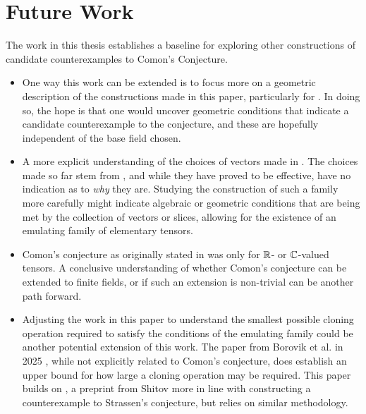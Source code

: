 \documentclass[../Lael_John_MasterThesis_Draft.tex]{subfiles}
\begin{document}
\section{Future Work}\label{section:furtherwork}
The work in this thesis establishes a baseline for exploring other constructions of candidate counterexamples to Comon's Conjecture. 
\begin{itemize}
    \item One way this work can be extended is to focus more on a geometric description of the constructions made in this paper, particularly for . In doing so, the hope is that one would uncover geometric conditions that indicate a candidate counterexample to the conjecture, and these are hopefully independent of the base field chosen. 
    \item A more explicit understanding of the choices of vectors made in . The choices made so far stem from \cite{shitov_comons_2020}, and while they have proved to be effective, have no indication as to \textit{why} they are. Studying the construction of such a family more carefully might indicate algebraic or geometric conditions that are being met by the collection of vectors or slices, allowing for the existence of an emulating family of elementary tensors.
    \item Comon's conjecture as originally stated in \cite{oeding_report_2008} was only for $\mathbb{R}$- or $\mathbb{C}$-valued tensors. A conclusive understanding of whether Comon's conjecture can be extended to finite fields, or if such an extension is non-trivial can be another path forward.
    \item Adjusting the work in this paper to understand the smallest possible cloning operation required to satisfy the conditions of the emulating family could be another potential extension of this work. The paper from Borovik et al. in 2025 \cite{borovik_construction_2025}, while not explicitly related to Comon's conjecture, does establish an upper bound for how large a cloning operation may be required. This paper builds on \cite{shitov_higher_2024}, a preprint from Shitov more in line with constructing a counterexample to Strassen's conjecture, but relies on similar methodology. 

\end{itemize}
\end{document}

